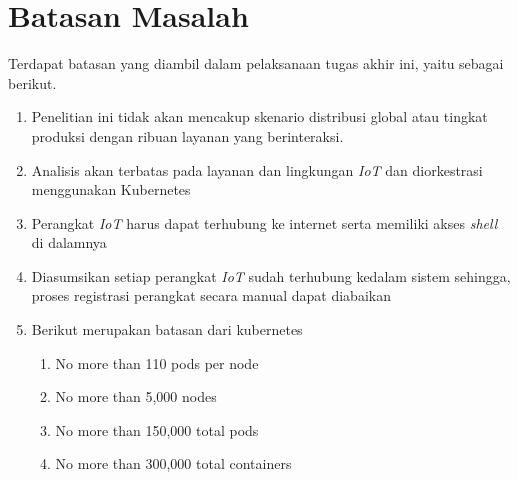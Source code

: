 \section{Batasan Masalah}
\label{sec:batasan-masalah}

Terdapat batasan yang diambil dalam pelaksanaan tugas akhir ini, yaitu sebagai berikut.

\begin{enumerate}
  \item Penelitian ini tidak akan mencakup skenario distribusi global atau tingkat produksi dengan ribuan layanan yang berinteraksi.
  \item Analisis akan terbatas pada layanan dan lingkungan \textit{IoT} dan diorkestrasi \\ menggunakan Kubernetes
  \item Perangkat \textit{IoT} harus dapat terhubung ke internet serta memiliki akses \textit{shell} di dalamnya
  \item Diasumsikan setiap perangkat \textit{IoT} sudah terhubung kedalam sistem sehingga, proses registrasi perangkat secara manual dapat diabaikan
  \item Berikut merupakan batasan dari kubernetes
        \begin{enumerate}
          \item No more than 110 pods per node
          \item No more than 5,000 nodes
          \item No more than 150,000 total pods
          \item No more than 300,000 total containers
        \end{enumerate}
\end{enumerate}

